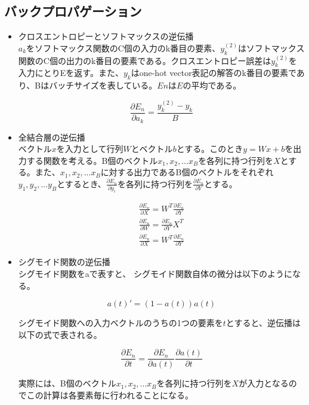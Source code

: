 \documentclass{ujarticle}
\begin{document}
\subsection{バックプロパゲーション}
\begin{itemize}
\item クロスエントロピーとソフトマックスの逆伝播\mbox{}\\
$a_k$をソフトマックス関数のC個の入力のk番目の要素、$y^{(2)}_k$はソフトマックス関数のC個の出力のk番目の要素である。クロスエントロピー誤差は$y^{(2)}_k$を入力にとりEを返す。また、$y_k$はone-hot vector表記の解答のk番目の要素であり、Bはバッチサイズを表している。$En$は$E$の平均である。
\setlength{\abovedisplayskip}{5pt} %
\begin{fleqn}[30pt]
\begin{equation}
\frac{\partial E_n}{\partial a_k} = \frac{y^{(2)}_k - y_k}{B}
\end{equation}
\end{fleqn}

\item 全結合層の逆伝播\mbox{}\\
ベクトル$x$を入力として行列$W$とベクトル$b$とする。このとき$y = W x + b$を出力する関数を考える。B個のベクトル$x_1, x_2, ... x_B$を各列に持つ行列を$X$とする。また、$x_1, x_2, ... x_B$に対する出力であるB個のベクトルをそれぞれ$y_1, y_2, ... y_B$とするとき、$\frac{\partial E_n}{\partial y_i}$を各列に持つ行列を$\frac{\partial E_n}{\partial Y}$とする。
\begin{fleqn}[30pt]
\begin{eqnarray}
\frac{\partial E_n}{\partial X} = W^T \frac{\partial E_n}{\partial Y}\\
\frac{\partial E_n}{\partial W} = \frac{\partial E_n}{\partial Y}X^T \\
\frac{\partial E_n}{\partial X} = W^T \frac{\partial E_n}{\partial Y}
\end{eqnarray}
\end{fleqn}

\item シグモイド関数の逆伝播\mbox{}\\
シグモイド関数をaで表すと、
シグモイド関数自体の微分は以下のようになる。
\begin{fleqn}[30pt]
\begin{equation}
a(t)' = (1 - a(t))a(t)
\end{equation}
\end{fleqn}
シグモイド関数への入力ベクトルのうちの1つの要素を$t$とすると、逆伝播は以下の式で表される。
\begin{fleqn}[30pt]
\begin{equation}
\frac{\partial E_n}{\partial t} = \frac{\partial E_n}{\partial a(t)} \frac{\partial a(t)}{\partial t}
\end{equation}
\end{fleqn}
実際には、B個のベクトル$x_1, x_2, ... x_B$を各列に持つ行列を$X$が入力となるのでこの計算は各要素毎に行われることになる。

\end{itemize}
\end{document}
